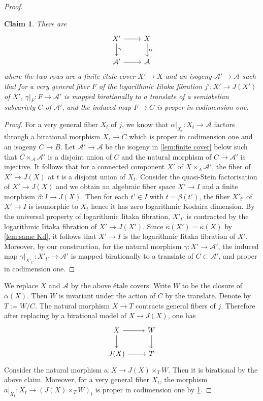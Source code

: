 \documentclass[11pt,english]{smfart}
\theoremstyle{plain}
\newtheorem{claim}[thm]{Claim}
\theoremstyle{definition}
\theoremstyle{remark}
\numberwithin{equation}{subsection}
\theoremstyle{plain}
\newcommand{\cA}{\mathcal A}
\begin{document}
\begin{proof}
	
	
	\begin{claim}\label{claim:20221105}
		There are 
		\begin{equation*}
			\begin{tikzcd}
				X' \arrow[r] \arrow[d, "\gamma"] & X\arrow[d,"\alpha"]\\
				\cA' \arrow[r] & \cA
			\end{tikzcd}
		\end{equation*}
		where the two rows are a finite     \'etale cover $X'\to X$ and an isogeny $\cA'\to \cA$  such that for a very general fiber $F$ of the logarithmic Iitaka fibration $j':X'\to J(X')$ of $X'$,  $\gamma|_{F}:F\to \cA'$ is mapped birationally to a translate of a semiabelian subvariety $C$ of $\cA'$, and the induced map $F\to C$ is proper in codimension one.
	\end{claim}
	\begin{proof}
		For a very general fiber $X_t$ of $j$,  we know that $\alpha|_{X_t}:X_t\to \cA$ factors through a birational morphism $X_t\to C$ which is proper in codimension one and an isogeny   $C\to B$.  
 Let $\cA'\to \cA$ be the isogeny in \cref{lem:finite cover}  below such that $C\times_{\cA}\cA'$ is a disjoint union of $C$ and the natural morphism of $C\to \cA'$ is injective.  
 It follows that  for a connected component $X'$ of $X\times_A\cA'$, the fiber of $X'\to J(X)$ at $t$ is a disjoint union of $X_t$.  
 Consider  the quasi-Stein factorisation of $X'\to J(X)$  and we obtain an algebraic fiber space $X'\to I$ and a finite morphism $\beta:I\to J(X)$.   
 Then for each $t'\in I$ with $t=\beta(t')$, the fiber $X'_{t'}$ of $X'\to I$ is isomorphic to $X_t$ hence it has zero logarithmic Kodaira dimension.   
 By the universal property of logarithmic Iitaka fibration,   $X'_{t'}$  is contracted by the logarithmic Iitaka fibration of $X'\to J(X')$. 
 Since $\bar{\kappa}(X')=\bar{\kappa}(X)$ by \cref{lem:same Kd}, it follows that $X'\to I$ is the logarithmic Iitaka fibration of $X'$.   Moreover, by our construction, for the natural morphism $\gamma:X'\to \cA'$,  the induced map $\gamma|_{X'_{t'}}:X'_{t'}\to \cA'$ is mapped birationally to a translate of $C\subset \cA'$, and proper in codimension one.
 \end{proof}

We replace $X$ and $\cA$ by the above \'etale covers.   
Write $W$ to be the closure of $\alpha(X)$. Then $W$ is invariant under the action of $C$ by the translate.  Denote by $T:=W/C$. The natural morphism $X\to T$ contracts general fibers of $j$. Therefore after replacing by a birational model of $X\to J(X)$, one has
	\begin{equation*}
		\begin{tikzcd}
			X \arrow[r] \arrow[d] &  W\arrow[d] \\
			J(X)  \arrow[r] & T
		\end{tikzcd}
	\end{equation*} 
	Consider the natural morphism $a: X\to J(X)\times_T W$. Then it is birational by the above claim.   Moreover,  for a very general fiber $X_t$, the morphism $a|_{X_t}:X_t\to (J(X)\times_T W)_t$ 
	 is proper in codimension one by \cref{claim:20221105}.  
	 	 

\end{proof}
\end{document}
